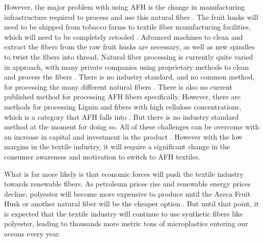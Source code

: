 \documentclass{article}
\begin{document}
However, the major problem with using AFH is the change in manufacturing infrastructure required to process and use this natural fiber \autocite{afhfiber}. The fruit husks will need to be shipped from tobacco farms to textile fiber manufacturing facilities, which will need to be completely retooled \autocite{afhfiber}. Advanced machines to clean and extract the fibers from the raw fruit husks are necessary, as well as new spindles to twist the fibers into thread. Natural fiber processing is currently quite varied in approach, with many private companies using proprietary methods to clean and process the fibers \autocite{afhfiber}. There is no industry standard, and no common method, for processing the many different natural fibers \autocite{afhfiber}. There is also no current published method for processing AFH fibers specifically. However, there are methods for processing Lignin and fibers with high cellulose concentrations, which is a category that AFH falls into \autocite{afhfiber}. But there is no industry standard method at the moment for doing so. All of these challenges can be overcome with an increase in capital and investment in the product \autocite{afhfiber}. However with the low margins in the textile industry, it will require a significant change in the consumer awareness and motivation to switch to AFH textiles.

What is far more likely is that economic forces will push the textile industry towards renewable fibers. As petroleum prices rise and renewable energy prices decline, polyester will become more expensive to produce until the Areca Fruit Husk or another natural fiber will be the cheaper option \autocite{afhfiber}. But until that point, it is expected that the textile industry will continue to use synthetic fibers like polyester, leading to thousands more metric tons of microplastics entering our oceans every year.


\printbibliography
\end{document}
